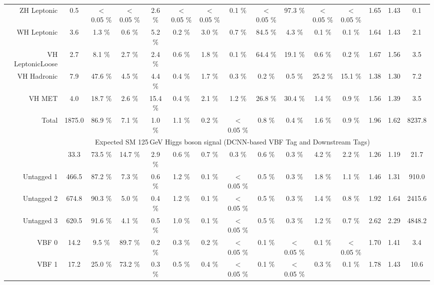 \begin{landscape}
\begin{table}
{\begin{tabular}{rcccccccccccccc}
        ZH Leptonic &    0.5  &  $<$0.05 \% &  $<$0.05 \% &  2.6 \% &  $<$0.05 \% &  $<$0.05 \% &  0.1 \% &  $<$0.05 \% &  97.3 \% &  $<$0.05 \% &  $<$0.05 \%& 1.65 & 1.43 & 0.1 \\
        WH Leptonic &    3.6  &  1.3 \% &  0.6 \% &  5.2 \% &  0.2 \% &  3.0 \% &  0.7 \% &  84.5 \% &  4.3 \% &  0.1 \% &  0.1 \%& 1.64 & 1.43 & 2.1 \\
        VH LeptonicLoose &    2.7  &  8.1 \% &  2.7 \% &  2.4 \% &  0.6 \% &  1.8 \% &  0.1 \% &  64.4 \% &  19.1 \% &  0.6 \% &  0.2 \%& 1.67 & 1.56 & 3.5 \\
        \rowcolor{VHH} VH Hadronic &    7.9  &  47.6 \% &  4.5 \% &  4.4 \% &  0.4 \% &  1.7 \% &  0.3 \% &  0.2 \% &  0.5 \% &  25.2 \% &  15.1 \%& 1.38 & 1.30 & 7.2 \\
        \rowcolor{VHM} VH MET &    4.0  &  18.7 \% &  2.6 \% &  15.4 \% &  0.4 \% &  2.1 \% &  1.2 \% &  26.8 \% &  30.4 \% &  1.4 \% &  0.9 \%& 1.56 & 1.39 & 3.5 \\
        \rowcolor{Gray} Total &    1875.0  &  86.9 \% &  7.1 \% &  1.0 \% &  1.1 \% &  0.2 \% &  $<$0.05 \% &  0.8 \% &  0.4 \% &  1.6 \% &  0.9 \%& 1.96 & 1.62 & 8237.8 \\
        \hline
            \multirow{2}{*}{} &\multicolumn{13}{c}{Expected SM 125\,GeV Higgs boson signal (DCNN-based VBF Tag and Downstream Tags)} & \\ \cline{2-14}
        \hline
        \rowcolor{GGH0} Untagged 0 &    33.3  &  73.5 \% &  14.7 \% &  2.9 \% &  0.6 \% &  0.7 \% &  0.3 \% &  0.6 \% &  0.3 \% &  4.2 \% &  2.2 \%& 1.26 & 1.19 &  21.7 \\
        \rowcolor{GGH1} Untagged 1 &    466.5  &  87.2 \% &  7.3 \% &  0.6 \% &  1.2 \% &  0.1 \% &  $<$0.05 \% &  0.5 \% &  0.3 \% &  1.8 \% &  1.1 \%& 1.46 & 1.31 &  910.0 \\
        \rowcolor{GGH2} Untagged 2 &    674.8  &  90.3 \% &  5.0 \% &  0.4 \% &  1.2 \% &  0.1 \% &  $<$0.05 \% &  0.5 \% &  0.3 \% &  1.4 \% &  0.8 \%& 1.92 & 1.64 &  2415.6 \\
        \rowcolor{GGH3} Untagged 3 &    620.5  &  91.6 \% &  4.1 \% &  0.5 \% &  1.0 \% &  0.1 \% &  $<$0.05 \% &  0.5 \% &  0.3 \% &  1.2 \% &  0.7 \%& 2.62 & 2.29 &  4848.2 \\
        \rowcolor{VBF0} VBF 0 &    14.2  &  9.5 \% &  89.7 \% &  0.2 \% &  0.3 \% &  0.2 \% &  $<$0.05 \% &  0.1 \% &  $<$0.05 \% &  0.1 \% &  $<$0.05 \%& 1.70 & 1.41 &  3.4 \\
        \rowcolor{VBF1} VBF 1 &    17.2  &  25.0 \% &  73.2 \% &  0.3 \% &  0.5 \% &  0.4 \% &  $<$0.05 \% &  0.1 \% &  $<$0.05 \% &  0.3 \% &  0.1 \%& 1.78 & 1.43 & 10.6 \\

\end{tabular}}
\end{table}
\end{landscape}

